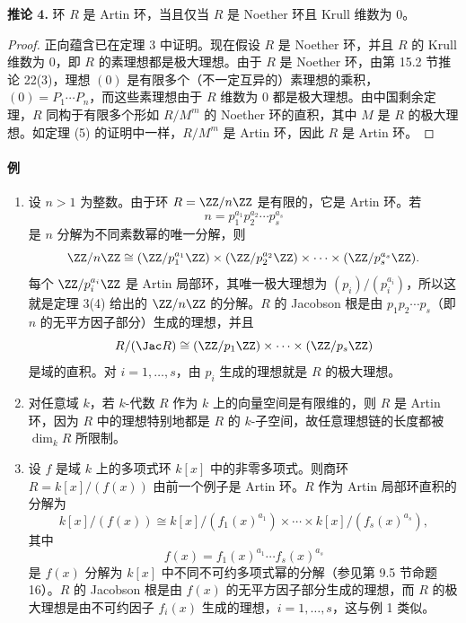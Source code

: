 \medskip
\noindent\textbf{推论 4.} 环 $R$ 是 Artin 环，当且仅当 $R$ 是 Noether 环且 Krull 维数为 $0$。

\begin{proof}
正向蕴含已在定理 3 中证明。现在假设 $R$ 是 Noether 环，并且 $R$ 的 Krull 维数为 $0$，即 $R$ 的素理想都是极大理想。由于 $R$ 是 Noether 环，由第 15.2 节推论 22(3)，理想 $(0)$ 是有限多个（不一定互异的）素理想的乘积，$(0)=P_1\cdots P_n$，而这些素理想由于 $R$ 维数为 $0$ 都是极大理想。由中国剩余定理，$R$ 同构于有限多个形如 $R/M^m$ 的 Noether 环的直积，其中 $M$ 是 $R$ 的极大理想。如定理 (5) 的证明中一样，$R/M^m$ 是 Artin 环，因此 $R$ 是 Artin 环。
\end{proof}

\paragraph{例}
\begin{enumerate}[label=(\arabic*)]
  \item 设 $n>1$ 为整数。由于环 $R=\ZZ/n\ZZ$ 是有限的，它是 Artin 环。若
  \[
    n=p_1^{a_1}p_2^{a_2}\cdots p_s^{a_s}
  \]
  是 $n$ 分解为不同素数幂的唯一分解，则
  \[
    \ZZ/n\ZZ\cong (\ZZ/p_1^{a_1}\ZZ)\times(\ZZ/p_2^{a_2}\ZZ)\times\cdots\times(\ZZ/p_s^{a_s}\ZZ).
  \]
  每个 $\ZZ/p_i^{a_i}\ZZ$ 是 Artin 局部环，其唯一极大理想为 $(p_i)/(p_i^{a_i})$，所以这就是定理 3(4) 给出的 $\ZZ/n\ZZ$ 的分解。$R$ 的 Jacobson 根是由 $p_1p_2\cdots p_s$（即 $n$ 的无平方因子部分）生成的理想，并且
  \[
    R/(\Jac R)\cong (\ZZ/p_1\ZZ)\times\cdots\times(\ZZ/p_s\ZZ)
  \]
  是域的直积。对 $i=1,\ldots,s$，由 $p_i$ 生成的理想就是 $R$ 的极大理想。

  \item 对任意域 $k$，若 $k$-代数 $R$ 作为 $k$ 上的向量空间是有限维的，则 $R$ 是 Artin 环，因为 $R$ 中的理想特别地都是 $R$ 的 $k$-子空间，故任意理想链的长度都被 $\dim_k R$ 所限制。

  \item 设 $f$ 是域 $k$ 上的多项式环 $k[x]$ 中的非零多项式。则商环 $R=k[x]/(f(x))$ 由前一个例子是 Artin 环。$R$ 作为 Artin 局部环直积的分解为
  \[
    k[x]/(f(x))\cong k[x]/(f_1(x)^{a_1})\times\cdots\times k[x]/(f_s(x)^{a_s}),
  \]
  其中
  \[
    f(x)=f_1(x)^{a_1}\cdots f_s(x)^{a_s}
  \]
  是 $f(x)$ 分解为 $k[x]$ 中不同不可约多项式幂的分解（参见第 9.5 节命题 16）。$R$ 的 Jacobson 根是由 $f(x)$ 的无平方因子部分生成的理想，而 $R$ 的极大理想是由不可约因子 $f_i(x)$ 生成的理想，$i=1,\ldots,s$，这与例 1 类似。
\end{enumerate}

